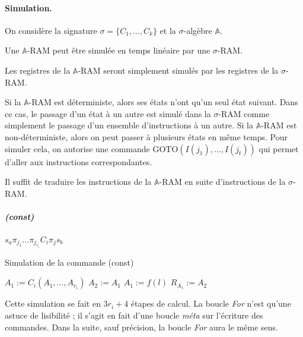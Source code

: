 \documentclass{article}
\newcommand{\bbA}{\mathbb{A}}
\begin{document}
			
			\paragraph{Simulation.}
			On considère la signature $\sigma = \{C_1, \dots, C_k\}$ et la $\sigma$-algèbre $\bbA$.
			
			\begin{lemma}
				Une $\bbA$-RAM peut être simulée en temps linéaire par une $\sigma$-RAM.
			\end{lemma}
			
			\begin{demo}
				Les registres de la $\bbA$-RAM seront simplement simulés par les registres de la $\sigma$-RAM. 
				
				Si la $\bbA$-RAM est déterministe, alors ses états n'ont qu'un seul état suivant. Dans ce cas, le passage d'un état à un autre est simulé dans la $\sigma$-RAM comme simplement le passage d'un ensemble d'instructions à un autre. Si la $\bbA$-RAM est non-déterministe, alors on peut passer à plusieurs états en même temps. Pour simuler cela, on autorise une commande $\text{GOTO}(I(j_1), \dots, I(j_t))$ qui permet d'aller aux instructions correspondantes. 
				
				Il suffit de traduire les instructions de la $\bbA$-RAM en suite d'instructions de la $\sigma$-RAM.
				
				\subparagraph{(const)}
				$s_a \pi_{j_1} \dots \pi_{j_{r_i}} C_i \pi_j s_b$
				
				\begin{algorithm}[H]
					\caption{Simulation de la commande (const)}
					
						
					
					$A_1 := C_i (A_1, \dots, A_{r_i})$\;
					$A_2 := A_1$\;
					$A_1 := f(l)$\;
					$R_{A_1} := A_2$\;
					
				\end{algorithm}
				
				\espace
				
				Cette simulation se fait en $3r_i + 4$ étapes de calcul. La boucle \emph{For} n'est qu'une astuce de lisibilité ; il s'agit en fait d'une boucle \emph{méta} sur l'écriture des commandes. Dans la suite, sauf précision, la boucle \emph{For} aura le même sens. 
				

\end{demo}
\end{document}
